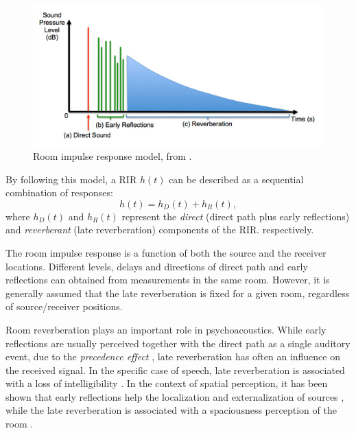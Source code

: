 \begin{figure}[t!]
	\begin{center}
	\includegraphics[width=\textwidth]{Figures/Introduction/Acoustic_room_impulse_response.jpg}
	\caption{Room impulse response model, from \cite{murphy2017acoustic}.}
	\label{fig:rir}
	\end{center}
\end{figure}

By following this model, a RIR $h(t)$ can be described as a sequential combination of responses:
\begin{equation}
	h(t) = h_D(t) + h_R(t),
\label{eq:directreverberant}
\end{equation}
where $h_D(t)$ and $h_R(t)$ represent the \textit{direct} (direct path plus early reflections) and \textit{reverberant} (late reverberation) components of the RIR. respectively.

The room impulse response is a function of both the source and the receiver locations. Different levels, delays and directions of direct path and early reflections can obtained from measurements in the same room. However, it is generally assumed that the late reverberation is fixed for a given room, regardless of source/receiver positions. 

Room reverberation plays an important role in psychoacoustics. While early reflections are usually perceived together with the direct path as a single auditory event, due to the \textit{precedence effect} \cite{haas1972influence}, late reverberation has often an influence on the received signal. In the specific case of speech, late reverberation is associated with a loss of intelligibility \cite{braun2018speech}.
In the context of spatial perception, it has been shown that early reflections help the localization and externalization of sources \cite{rudrich2019improving}, while the late reverberation is associated with a spaciousness perception of the room \cite{begault20003}. 



